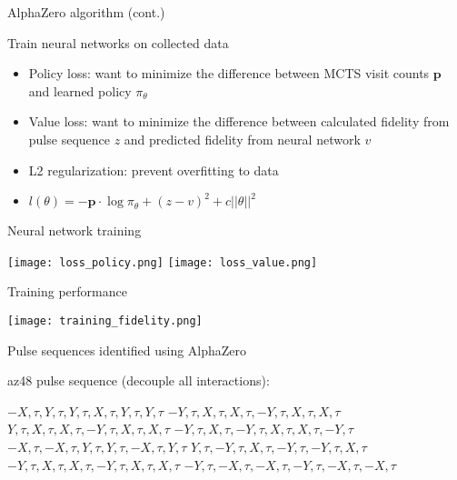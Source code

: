 \documentclass{beamer}
\begin{document}
\begin{frame}{AlphaZero algorithm (cont.)}

Train neural networks on collected data

\begin{itemize}

\item
Policy loss: want to minimize the difference between MCTS visit
counts \(\mathbf{p}\) and learned policy \(\pi_\theta\)
\item
Value loss: want to minimize the difference between calculated
fidelity from pulse sequence \(z\) and predicted fidelity from
neural network \(v\)
\item
L2 regularization: prevent overfitting to data
\item
\(l(\theta) = -\mathbf{p} \cdot \log\pi_\theta + (z - v)^2 + c||\theta||^2\)
\end{itemize}
\end{frame}


\begin{frame}{Neural network training}

\texttt{[image: loss\_policy.png]}
\texttt{[image: loss\_value.png]}
\end{frame}

\begin{frame}{Training performance}

\texttt{[image: training\_fidelity.png]}
\end{frame}

\begin{frame}{Pulse sequences identified using AlphaZero}

\textrm{az48} pulse sequence (decouple all interactions):

$ -X, \tau, Y, \tau, Y, \tau, X, \tau, Y, \tau, Y, \tau $
$ -Y, \tau, X, \tau, X, \tau, -Y, \tau, X, \tau, X, \tau $
$ Y, \tau, X, \tau, X, \tau, -Y, \tau, X, \tau, X, \tau $
$ -Y, \tau, X, \tau, -Y, \tau, X, \tau, X, \tau, -Y, \tau $
$ -X, \tau, -X, \tau, Y, \tau, Y, \tau, -X, \tau, Y, \tau $
$ Y, \tau, -Y, \tau, X, \tau, -Y, \tau, -Y, \tau, X, \tau $
$ -Y, \tau, X, \tau, X, \tau, -Y, \tau, X, \tau, X, \tau $
$ -Y, \tau, -X, \tau, -X, \tau, -Y, \tau, -X, \tau, -X, \tau $

\end{frame}
\end{document}
